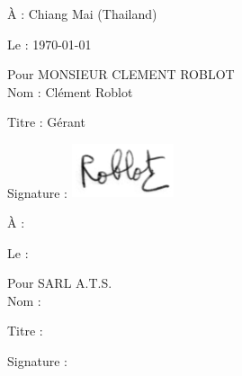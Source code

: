 \documentclass[]{karlito}
\newcommand{\nameBeneficiaryCompanie}{MONSIEUR CLEMENT ROBLOT}
\newcommand{\nameBeneficiaryPerson}{Clément Roblot}
\newcommand{\locationBeneficiary}{Chiang Mai (Thailand)}
\newcommand{\nameIssuingCompanie}{SARL A.T.S.}
\newcommand{\nameIssuingPerson}{}
\newcommand{\titleIssuingPerson}{}
\begin{document}
\begin{minipage}{0.45\textwidth}
À : \locationBeneficiary

Le : \today
\newline

Pour \nameBeneficiaryCompanie\\
Nom : \nameBeneficiaryPerson

Titre : Gérant


Signature :
\newline
\includegraphics[width=3cm]{images/signature.png}


\end{minipage}%
\hfill
\begin{minipage}{0.45\textwidth}
À :

Le :
\newline

Pour \nameIssuingCompanie\\
Nom : \nameIssuingPerson

Titre : \titleIssuingPerson


Signature :



\end{minipage}%






\appendix
\end{document}
